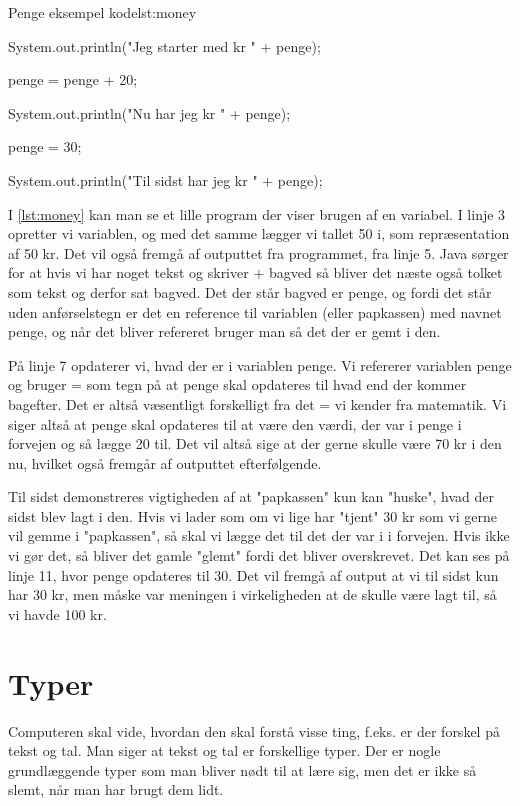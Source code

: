 {\begin{JavaCode}{Penge eksempel kode}{lst:money}
{{		System.out.println("Jeg starter med kr " + penge);
		
		penge = penge + 20;
		
		System.out.println("Nu har jeg kr " + penge);
		
		penge = 30;
		
		System.out.println("Til sidst har jeg kr " + penge);
	}
}
\end{JavaCode}

I \autoref{lst:money} kan man se et lille program der viser brugen af en variabel. I linje 3 opretter vi variablen, og med det samme lægger vi tallet 50 i, som repræsentation af 50 kr. Det vil også fremgå af outputtet fra programmet, fra linje 5. Java sørger for at hvis vi har noget tekst og skriver + bagved så bliver det næste også tolket som tekst og derfor sat bagved. Det der står bagved er penge, og fordi det står uden anførselstegn er det en reference til variablen (eller papkassen) med navnet penge, og når det bliver refereret bruger man så det der er gemt i den.

På linje 7 opdaterer vi, hvad der er i variablen penge. Vi refererer variablen penge og bruger = som tegn på at penge skal opdateres til hvad end der kommer bagefter. Det er altså væsentligt forskelligt fra det = vi kender fra matematik. Vi siger altså at penge skal opdateres til at være den værdi, der var i penge i forvejen og så lægge 20 til. Det vil altså sige at der gerne skulle være 70 kr i den nu, hvilket også fremgår af outputtet efterfølgende.

Til sidst demonstreres vigtigheden af at "papkassen" kun kan "huske", hvad der sidst blev lagt i den. Hvis vi lader som om vi lige har "tjent" 30 kr som vi gerne vil gemme i "papkassen", så skal vi lægge det til det der var i i forvejen. Hvis ikke vi gør det, så bliver det gamle "glemt" fordi det bliver overskrevet. Det kan ses på linje 11, hvor penge opdateres til 30. Det vil fremgå af output at vi til sidst kun har 30 kr, men måske var meningen i virkeligheden at de skulle være lagt til, så vi havde 100 kr.

\section{Typer}
Computeren skal vide, hvordan den skal forstå visse ting, f.eks. er der forskel på tekst og tal. Man siger at tekst og tal er forskellige typer. Der er nogle grundlæggende typer som man bliver nødt til at lære sig, men det er ikke så slemt, når man har brugt dem lidt.

}
